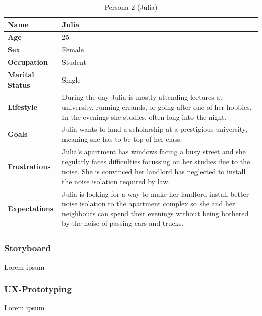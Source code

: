 \begin{table}[H]
    \centering
    \begin{tabularx}{\textwidth}{|l|X|}
        \hline
        \textbf{Name} & Julia \\
        \hline
        \textbf{Age} & 25 \\
        \hline
        \textbf{Sex} & Female \\
        \hline
        \textbf{Occupation} & Student \\
        \hline
        \textbf{Marital Status} & Single \\
        \hline
        \textbf{Lifestyle} & During the day Julia is mostly attending lectures at university, running errands, or going after one of her hobbies.
        In the evenings she studies, often long into the night. \\
        \hline
        \textbf{Goals} & Julia wants to land a scholarship at a prestigious university, meaning she has to be top of her class. \\
        \hline
        \textbf{Frustrations} & Julia's apartment has windows facing a busy street and she regularly faces difficulties focussing on her studies
        due to the noise. She is convinced her landlord has neglected to install the noise isolation required by law. \\
        \hline
        \textbf{Expectations} & Julia is looking for a way to make her landlord install better noise isolation to the apartment complex so she and
        her neighbours can spend their evenings without being bothered by the noise of passing cars and trucks. \\
        \hline
    \end{tabularx}
    \caption{Persona 2 (Julia)}
    \label{table:persona2}
\end{table}

\subsubsection{Storyboard}
\label{subsubsec:storyboard}
Lorem ipsum

\subsubsection{UX-Prototyping}
\label{subsubsec:ux_prototyping}
Lorem ipsum